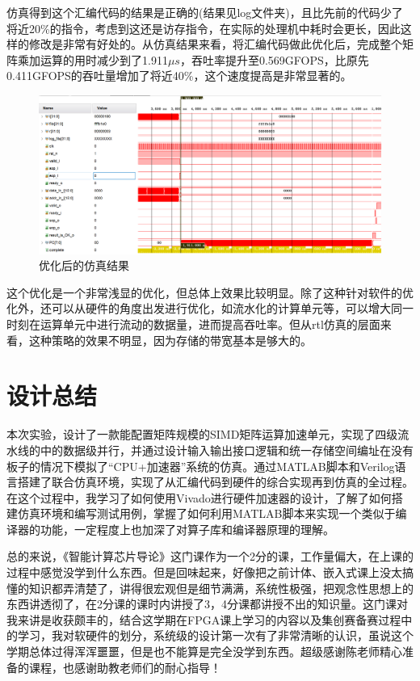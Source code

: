 \documentclass{article}
\begin{document}
    仿真得到这个汇编代码的结果是正确的(结果见log文件夹)，且比先前的代码少了将近20\%的指令，考虑到这还是访存指令，在实际的处理机中耗时会更长，因此这样的修改是非常有好处的。从仿真结果来看，将汇编代码做此优化后，完成整个矩阵乘加运算的用时减少到了1.911$\mu s$，吞吐率提升至0.569GFOPS，比原先0.411GFOPS的吞吐量增加了将近40\%，这个速度提高是非常显著的。

    \begin{figure}[!ht]
        \centering
        \includegraphics[width = \textwidth]{thp.png}
        \caption{优化后的仿真结果}
    \end{figure}

    这个优化是一个非常浅显的优化，但总体上效果比较明显。除了这种针对软件的优化外，还可以从硬件的角度出发进行优化，如流水化的计算单元等，可以增大同一时刻在运算单元中进行流动的数据量，进而提高吞吐率。但从rtl仿真的层面来看，这种策略的效果不明显，因为存储的带宽基本是够大的。



\section{设计总结}
    本次实验，设计了一款能配置矩阵规模的SIMD矩阵运算加速单元，实现了四级流水线的中的数据级并行，并通过设计输入输出接口逻辑和统一存储空间编址在没有板子的情况下模拟了``CPU+加速器''系统的仿真。通过MATLAB脚本和Verilog语言搭建了联合仿真环境，实现了从汇编代码到硬件的综合实现再到仿真的全过程。在这个过程中，我学习了如何使用Vivado进行硬件加速器的设计，了解了如何搭建仿真环境和编写测试用例，掌握了如何利用MATLAB脚本来实现一个类似于编译器的功能，一定程度上也加深了对算子库和编译器原理的理解。

    总的来说，《智能计算芯片导论》这门课作为一个2分的课，工作量偏大，在上课的过程中感觉没学到什么东西。但是回味起来，好像把之前计体、嵌入式课上没太搞懂的知识都弄清楚了，讲得很宏观但是细节满满，系统性极强，把观念性思想上的东西讲透彻了，在2分课的课时内讲授了3，4分课都讲授不出的知识量。这门课对我来讲是收获颇丰的，结合这学期在FPGA课上学习的内容以及集创赛备赛过程中的学习，我对软硬件的划分，系统级的设计第一次有了非常清晰的认识，虽说这个学期总体过得浑浑噩噩，但是也不能算是完全没学到东西。超级感谢陈老师精心准备的课程，也感谢助教老师们的耐心指导！
\end{document}
